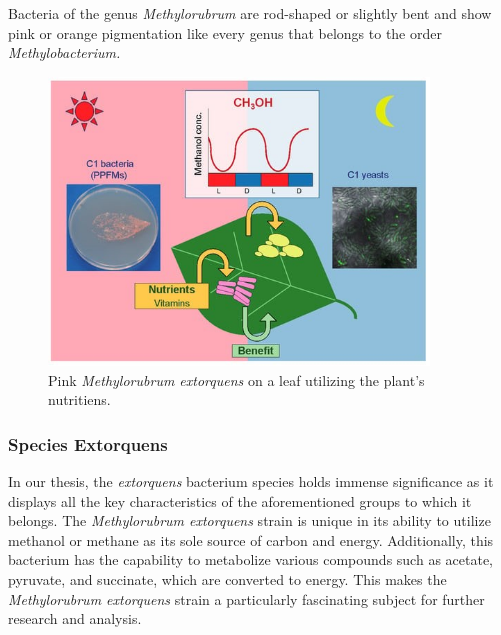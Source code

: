 Bacteria of the genus \emph{Methylorubrum} are rod-shaped or slightly bent and show pink or
orange pigmentation like every genus that belongs to the order \emph{Methylobacterium.}

\begin{figure}[H]
    \centering
    \includegraphics[width=0.9\textwidth]{./media/images/mextorquens_on_leaf}
    \caption{Pink \emph{Methylorubrum extorquens} on a leaf utilizing the plant's nutritiens.}
    \label{fig:mextorquens_on_leaf}
\end{figure}

\subsubsection{Species Extorquens}
In our thesis, the \emph{extorquens} bacterium species holds immense significance as it displays all the key characteristics of the aforementioned groups to which it belongs.
The \emph{Methylorubrum extorquens} strain is unique in its ability to utilize methanol or methane as its sole source of carbon and energy.
Additionally, this bacterium has the capability to metabolize various compounds such as acetate, pyruvate, and succinate, which are converted to energy.
This makes the \emph{Methylorubrum extorquens} strain a particularly fascinating subject for further research and analysis.

